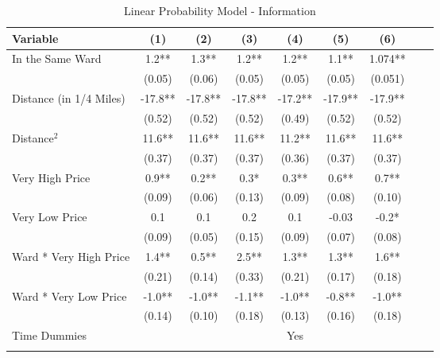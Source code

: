 \documentclass[AEJ,draftmode]{AEA}
\newcommand{\se}[1]{\footnotesize{(#1)}}
\begin{document}
\begin{sidewaystable}[ht]
\centering
\caption{Linear Probability Model - Information}

\begin{tabular}{@{}lcccccccc@{}} \toprule
Variable                                 & (1)       & (2)       & (3)       & (4)       & (5)       & (6)   \\\midrule
\multirow{2}{*}{In the Same Ward}        & 1.2**     & 1.3**     & 1.2**     & 1.2**     & 1.1**     & 1.074**\\
                                         & \se{0.05} & \se{0.06} & \se{0.05} & \se{0.05} & \se{0.05} & \se{0.051}\\
\multirow{2}{*}{Distance (in 1/4 Miles)} & -17.8**   & -17.8**   & -17.8**   & -17.2**   & -17.9**   & -17.9**\\
                                         & \se{0.52} & \se{0.52} & \se{0.52} & \se{0.49} & \se{0.52} & \se{0.52}\\
\multirow{2}{*}{Distance$^2$ }           & 11.6**    & 11.6**    & 11.6**    & 11.2**    & 11.6**    & 11.6**\\
                                         & \se{0.37} & \se{0.37} & \se{0.37} & \se{0.36} & \se{0.37} & \se{0.37}\\
\multirow{2}{*}{Very High Price}         & 0.9**     & 0.2**     & 0.3*      & 0.3**     & 0.6**     & 0.7**\\
                                         & \se{0.09} & \se{0.06} & \se{0.13} & \se{0.09} & \se{0.08} & \se{0.10}\\
\multirow{2}{*}{Very Low Price}          & 0.1       & 0.1       & 0.2       & 0.1       & -0.03     & -0.2*\\
                                         & \se{0.09} & \se{0.05} & \se{0.15} & \se{0.09} & \se{0.07} & \se{0.08}\\
\multirow{2}{*}{Ward * Very High Price}  & 1.4**     & 0.5**     & 2.5**     & 1.3**     & 1.3**     & 1.6**\\
                                         & \se{0.21} & \se{0.14} & \se{0.33} & \se{0.21} & \se{0.17} & \se{0.18} \\
\multirow{2}{*}{Ward * Very Low Price }  & -1.0**    & -1.0**    & -1.1**    & -1.0**    & -0.8**    & -1.0**\\
                                         & \se{0.14} & \se{0.10} & \se{0.18} & \se{0.13} & \se{0.16} & \se{0.18}\\\addlinespace
Time Dummies            &           &           &           & Yes       &           &\\\addlinespace

\end{tabular}
\end{sidewaystable}
\end{document}
